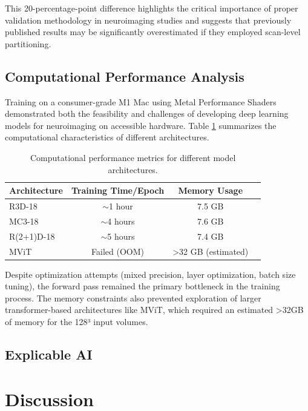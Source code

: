\documentclass[12pt, a4paper]{article}
\begin{document}
This 20-percentage-point difference highlights the critical importance of proper validation methodology in neuroimaging studies and suggests that previously published results may be significantly overestimated if they employed scan-level partitioning.

\subsection{Computational Performance Analysis}

Training on a consumer-grade M1 Mac using Metal Performance Shaders demonstrated both the feasibility and challenges of developing deep learning models for neuroimaging on accessible hardware. Table \ref{tab:computational_performance} summarizes the computational characteristics of different architectures.

\begin{table}[htbp]
\centering
\begin{tabular}{|l|c|c|c|}
\hline
\textbf{Architecture} & \textbf{Training Time/Epoch} & \textbf{Memory Usage} \\
\hline
R3D-18 & $\sim$1 hour & 7.5 GB \\
\hline
MC3-18 & $\sim$4 hours & 7.6 GB \\
\hline
R(2+1)D-18 & $\sim$5 hours & 7.4 GB \\
\hline
MViT & Failed (OOM) & >32 GB (estimated) \\
\hline
\end{tabular}
\caption{Computational performance metrics for different model architectures.}
\label{tab:computational_performance}
\end{table}

Despite optimization attempts (mixed precision, layer optimization, batch size tuning), the forward pass remained the primary bottleneck in the training process. The memory constraints also prevented exploration of larger transformer-based architectures like MViT, which required an estimated >32GB of memory for the 128³ input volumes.

\subsection{Explicable AI}

\section{Discussion}
\end{document}
